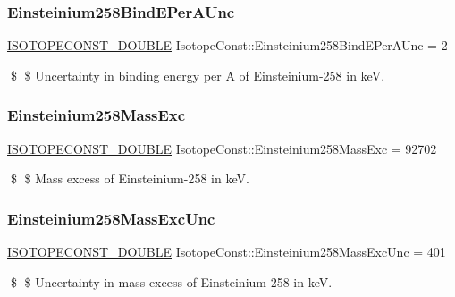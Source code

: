 \subsubsection{\texorpdfstring{Einsteinium258\+Bind\+E\+Per\+A\+Unc}{Einsteinium258BindEPerAUnc}}
{\footnotesize\ttfamily \mbox{\hyperlink{group___isotope_const-_macros_ga8f45a7272ce02c0b4c65c44636ed719a}{I\+S\+O\+T\+O\+P\+E\+C\+O\+N\+S\+T\+\_\+\+D\+O\+U\+B\+LE}} Isotope\+Const\+::\+Einsteinium258\+Bind\+E\+Per\+A\+Unc = 2}

\$ \$ Uncertainty in binding energy per A of Einsteinium-\/258 in keV. \mbox{\label{group___isotope_const-_einsteinium-_es258_ga4cf81f745276b115ae8a58934eeecfeb}} 
\subsubsection{\texorpdfstring{Einsteinium258\+Mass\+Exc}{Einsteinium258MassExc}}
{\footnotesize\ttfamily \mbox{\hyperlink{group___isotope_const-_macros_ga8f45a7272ce02c0b4c65c44636ed719a}{I\+S\+O\+T\+O\+P\+E\+C\+O\+N\+S\+T\+\_\+\+D\+O\+U\+B\+LE}} Isotope\+Const\+::\+Einsteinium258\+Mass\+Exc = 92702}

\$ \$ Mass excess of Einsteinium-\/258 in keV. \mbox{\label{group___isotope_const-_einsteinium-_es258_ga085658b06aa961600dc2e0fd5b70e239}} 
\subsubsection{\texorpdfstring{Einsteinium258\+Mass\+Exc\+Unc}{Einsteinium258MassExcUnc}}
{\footnotesize\ttfamily \mbox{\hyperlink{group___isotope_const-_macros_ga8f45a7272ce02c0b4c65c44636ed719a}{I\+S\+O\+T\+O\+P\+E\+C\+O\+N\+S\+T\+\_\+\+D\+O\+U\+B\+LE}} Isotope\+Const\+::\+Einsteinium258\+Mass\+Exc\+Unc = 401}

\$ \$ Uncertainty in mass excess of Einsteinium-\/258 in keV. \mbox{\label{group___isotope_const-_einsteinium-_es258_ga9f78b927b7b43c340879b856d438de98}} 
